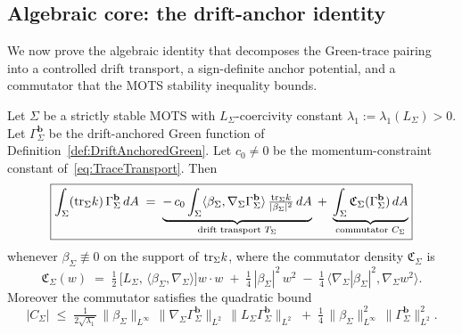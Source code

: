 \subsection{Algebraic core: the drift-anchor identity}

We now prove the algebraic identity that decomposes the Green-trace pairing into a controlled drift transport, a sign-definite anchor potential, and a commutator that the MOTS stability inequality bounds.

\begin{lemma}\label{lem:DriftAnchorDecomposition}
Let $\Sigma$ be a strictly stable MOTS with $L_\Sigma$-coercivity constant $\lambda_1:=\lambda_1(L_\Sigma)>0$. Let $\Gamma_\Sigma^{\mathbf b}$ be the drift-anchored Green function of Definition~\ref{def:DriftAnchoredGreen}. Let $c_0\ne0$ be the momentum-constraint constant of~\eqref{eq:TraceTransport}. Then
\begin{equation}\label{eq:DriftAnchorIdentity}
    \boxed{
    \int_\Sigma (\mathrm{tr}_\Sigma k)\,\Gamma_\Sigma^{\mathbf b}\,dA
    \;=\;
    \underbrace{-\,c_0\int_\Sigma\langle\beta_\Sigma,\nabla_\Sigma\Gamma_\Sigma^{\mathbf b}\rangle\,\tfrac{\mathrm{tr}_\Sigma k}{|\beta_\Sigma|^2}\,dA}_{\text{drift transport }T_\Sigma}
    \;+\;
    \underbrace{\int_\Sigma \mathfrak C_\Sigma(\Gamma_\Sigma^{\mathbf b})\,dA}_{\text{commutator }C_\Sigma}
    }
\end{equation}
whenever $\beta_\Sigma\not\equiv0$ on the support of $\mathrm{tr}_\Sigma k$, where the commutator density $\mathfrak C_\Sigma$ is
\begin{equation}\label{eq:CommutatorDensity}
    \mathfrak C_\Sigma(w)
    \;=\;
    \tfrac12\,\bigl[L_\Sigma,\,\langle\beta_\Sigma,\nabla_\Sigma\rangle\bigr]w\cdot w
    \;+\;
    \tfrac14\,|\beta_\Sigma|^2\,w^2
    \;-\;
    \tfrac14\,\bigl\langle\nabla_\Sigma|\beta_\Sigma|^2,\nabla_\Sigma w^2\bigr\rangle .
\end{equation}
Moreover the commutator satisfies the quadratic bound
\begin{equation}\label{eq:CommutatorBound}
    \bigl|C_\Sigma\bigr|
    \;\le\;
    \tfrac{1}{2\sqrt{\lambda_1}}\,\|\beta_\Sigma\|_{L^\infty}\,\|\nabla_\Sigma\Gamma_\Sigma^{\mathbf b}\|_{L^2}\,\|L_\Sigma\Gamma_\Sigma^{\mathbf b}\|_{L^2}
    \;+\;
    \tfrac14\,\|\beta_\Sigma\|_{L^\infty}^2\,\|\Gamma_\Sigma^{\mathbf b}\|_{L^2}^2 .
\end{equation}
\end{lemma}

